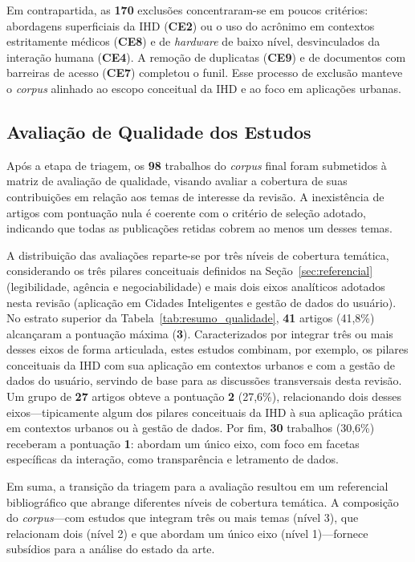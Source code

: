 \documentclass[12pt]{article}
\begin{document}
Em contrapartida, as \textbf{170} exclusões concentraram-se em poucos critérios: abordagens superficiais da IHD (\textbf{CE2}) ou o uso do acrônimo em contextos estritamente médicos (\textbf{CE8}) e de \textit{hardware} de baixo nível, desvinculados da interação humana (\textbf{CE4}). A remoção de duplicatas (\textbf{CE9}) e de documentos com barreiras de acesso (\textbf{CE7}) completou o funil. Esse processo de exclusão manteve o \textit{corpus} alinhado ao escopo conceitual da IHD e ao foco em aplicações urbanas.

\subsection{Avaliação de Qualidade dos Estudos}

    Após a etapa de triagem, os \textbf{98} trabalhos do \textit{corpus} final foram submetidos à matriz de avaliação de qualidade, visando avaliar a cobertura de suas contribuições em relação aos temas de interesse da revisão. A inexistência de artigos com pontuação nula é coerente com o critério de seleção adotado, indicando que todas as publicações retidas cobrem ao menos um desses temas.

    A distribuição das avaliações reparte-se por três níveis de cobertura temática, considerando os três pilares conceituais definidos na Seção~\ref{sec:referencial} (legibilidade, agência e negociabilidade) e mais dois eixos analíticos adotados nesta revisão (aplicação em Cidades Inteligentes e gestão de dados do usuário). No estrato superior da Tabela~\ref{tab:resumo_qualidade}, \textbf{41} artigos (41,8\%) alcançaram a pontuação máxima (\textbf{3}). Caracterizados por integrar três ou mais desses eixos de forma articulada, estes estudos combinam, por exemplo, os pilares conceituais da IHD com sua aplicação em contextos urbanos e com a gestão de dados do usuário, servindo de base para as discussões transversais desta revisão. Um grupo de \textbf{27} artigos obteve a pontuação \textbf{2} (27,6\%), relacionando dois desses eixos---tipicamente algum dos pilares conceituais da IHD à sua aplicação prática em contextos urbanos ou à gestão de dados. Por fim, \textbf{30} trabalhos (30,6\%) receberam a pontuação \textbf{1}: abordam um único eixo, com foco em facetas específicas da interação, como transparência e letramento de dados.

    Em suma, a transição da triagem para a avaliação resultou em um referencial bibliográfico que abrange diferentes níveis de cobertura temática. A composição do \textit{corpus}---com estudos que integram três ou mais temas (nível 3), que relacionam dois (nível 2) e que abordam um único eixo (nível 1)---fornece subsídios para a análise do estado da arte.
\end{document}
